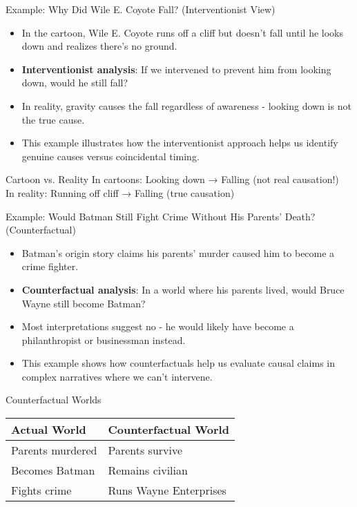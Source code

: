 \documentclass{beamer}
\begin{document}
	\begin{frame}{Example: Why Did Wile E. Coyote Fall? (Interventionist View)}
		\begin{itemize}
			\item In the cartoon, Wile E. Coyote runs off a cliff but doesn't fall until he looks down and realizes there's no ground.
			\item \textbf{Interventionist analysis}: If we intervened to prevent him from looking down, would he still fall?
			\item In reality, gravity causes the fall regardless of awareness - looking down is not the true cause.
			\item This example illustrates how the interventionist approach helps us identify genuine causes versus coincidental timing.
		\end{itemize}
		
		\begin{alertblock}{Cartoon vs. Reality}
			In cartoons: Looking down → Falling (not real causation!)\\
			In reality: Running off cliff → Falling (true causation)
		\end{alertblock}
	\end{frame}
	
	\begin{frame}{Example: Would Batman Still Fight Crime Without His Parents' Death? (Counterfactual)}
		\begin{itemize}
			\item Batman's origin story claims his parents' murder caused him to become a crime fighter.
			\item \textbf{Counterfactual analysis}: In a world where his parents lived, would Bruce Wayne still become Batman?
			\item Most interpretations suggest no - he would likely have become a philanthropist or businessman instead.
			\item This example shows how counterfactuals help us evaluate causal claims in complex narratives where we can't intervene.
		\end{itemize}
		
		\begin{block}{Counterfactual Worlds}
			\begin{tabular}{l|l}
				\textbf{Actual World} & \textbf{Counterfactual World} \\
				\hline
				Parents murdered & Parents survive \\
				Becomes Batman & Remains civilian \\
				Fights crime & Runs Wayne Enterprises \\
			\end{tabular}
		\end{block}
	\end{frame}
	
\end{document}
